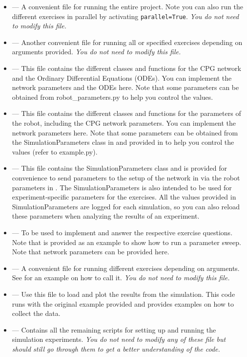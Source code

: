 \documentclass{cmc}
\begin{document}
\begin{itemize}
\item {} --- A convenient file for running the entire
  project. Note you can also run the different exercises in parallel by
  activating \texttt{parallel=True}. \textit{You do not need to modify this
    file.}
\item {} --- Another convenient file for running all
  or specified exercises depending on arguments provided. \textit{You do not
    need to modify this file.}
\item {} --- This file contains the different classes and
  functions for the CPG network and the Ordinary Differential Equations
  (ODEs). You can implement the network parameters and the ODEs here. Note that
  some parameters can be obtained from robot\_parameters.py to help you control
  the values.
\item {} --- This file contains the different
  classes and functions for the parameters of the robot, including the CPG
  network parameters. You can implement the network parameters here. Note that
  some parameters can be obtained from the SimulationParameters class in
   and provided in  to
  help you control the values (refer to example.py).
\item {} --- This file contains the
  SimulationParameters class and is provided for convenience to send parameters
  to the setup of the network in  via the
  robot parameters in . The
  SimulationParameters is also intended to be used for experiment-specific
  parameters for the exercises. All the values provided in SimulationParameters
  are logged for each simulation, so you can also reload these parameters when
  analyzing the results of an experiment.
\item {} --- To be used to implement and answer the
  respective exercise questions. Note that  is
  provided as an example to show how to run a parameter sweep. Note that network
  parameters can be provided here.
\item {} --- A convenient file for running different
  exercises depending on arguments. See  for an example
  on how to call it. \textit{You do not need to modify this file.}
\item {} --- Use this file to load and plot the
  results from the simulation. This code runs with the original example provided
  and provides examples on how to collect the data.
\item {} --- Contains all the remaining
  scripts for setting up and running the simulation experiments. \textit{You do
    not need to modify any of these file but should still go through them to get
    a better understanding of the code.}

\end{itemize}
\end{document}
